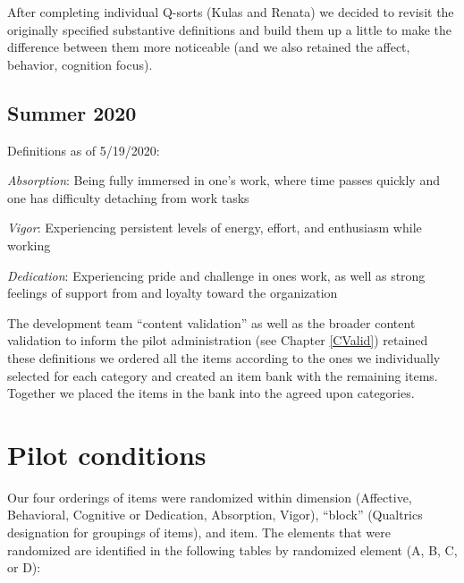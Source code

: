 \documentclass[
]{book}
\begin{document}
After completing individual Q-sorts (Kulas and Renata) we decided to revisit the originally specified substantive definitions and build them up a little to make the difference between them more noticeable (and we also retained the affect, behavior, cognition focus).

\hypertarget{summer-2020}{%
\section{Summer 2020}\label{summer-2020}}

Definitions as of 5/19/2020:

\emph{Absorption}: Being fully immersed in one's work, where time passes quickly and one has difficulty detaching from work tasks

\emph{Vigor}: Experiencing persistent levels of energy, effort, and enthusiasm while working

\emph{Dedication}: Experiencing pride and challenge in ones work, as well as strong feelings of support from and loyalty toward the organization

The development team ``content validation'' as well as the broader content validation to inform the pilot administration (see Chapter \ref{CValid}) retained these definitions we ordered all the items according to the ones we individually selected for each category and created an item bank with the remaining items. Together we placed the items in the bank into the agreed upon categories.

\hypertarget{pilot2}{%
\chapter{Pilot conditions}\label{pilot2}}

Our four orderings of items were randomized within dimension (Affective, Behavioral, Cognitive or Dedication, Absorption, Vigor), ``block'' (Qualtrics designation for groupings of items), and item. The elements that were randomized are identified in the following tables by randomized element (A, B, C, or D):
\end{document}
